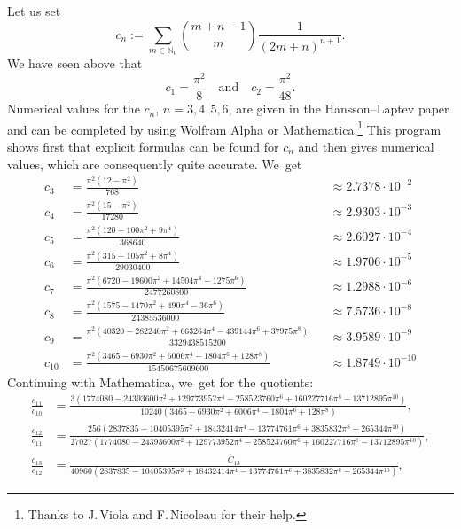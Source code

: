 \documentclass[JEP,XML,SOM,Unicode,published]{cedram}
\theoremstyle{definition}
\newcommand{\1}{\mathbbm{1}}
\newcommand{\N}{\mathbb{N}}
\begin{document}
Let us set
\begin{equation}\label{eq:defcn}
c_n := \sum_{m\in\N_0} \binom{m+n-1}{m} \frac{1}{(2m+n)^{n+1}}.
\end{equation}
We have seen above that
\[
c_1=\frac{\pi^2}8 \quad \text{and}\quad
c_2 = \frac{\pi^2}{48}.
\]
Numerical values for the $c_n$, $n=3,4,5,6$, are given in the Hansson--Laptev paper \cite{HL} and can be completed by using Wolfram Alpha or Mathematica.\footnote{Thanks to J.\,Viola and F.\,Nicoleau for their help.}
This program shows first that explicit formulas can be found for $c_n$ and then gives numerical values, which are consequently quite accurate. We~get
{\smaller\smaller
\[
\begin{aligned}
c_3 & = \frac{\pi^2(12-\pi^2)}{768} &&\approx 2.7378\cdot10^{-2}\\
c_4 & = \frac{\pi^2 (15-\pi^2)}{17280}&&\approx 2.9303 \cdot  10^{-3}\\
c_5& = \frac{\pi^2 (120-100\pi^2 + 9 \pi^4)}{368640}&&\approx 2.6027\cdot  10^{-4}\\
c_6&= \frac{\pi^2(315-105 \pi^2+ 8 \pi^4)}{29030400}&&\approx 1.9706 \cdot  10^{-5}\\
c_7&=\frac{\pi^2 (6720 - 19600 \pi^2 + 14504 \pi^4 - 1275 \pi^6)}{2477260800}&&\approx 1.2988\cdot 10^{-6}\\
c_8 &= \frac{\pi^2 (1575 - 1470 \pi^2 + 490 \pi ^4 - 36 \pi ^6)}{24385536000}&&\approx 7.5736\cdot10^{-8}\\
c_9&=\frac{\pi^2(40 320 - 282 240 \pi^2 + 663 264 \pi^4 - 439 144 \pi^6 + 37975 \pi^8)}{3329438515200}&&\approx 3.9589\cdot  10^{-9}\\
c_{10}&= \frac{\pi^2 (3465 - 6930 \pi^2 + 6006 \pi ^4 - 1804 \pi^6 + 128 \pi ^8)}{15450675609600}&&\approx1.8749\cdot10^{-10}
\end{aligned}
\]
}%
Continuing with Mathematica, we~get for the quotients:
{\smaller\smaller
\begin{align*}
\frac{c_{11}}{c_{10}} & = \frac{3 \left(1774080 - 24393600 \pi ^2 + 129773952 \pi ^4 - 258523760 \pi ^6 + 160227716 \pi ^8 - 13712895 \pi ^{10}\right)}{10240
\left(3465-6930 \pi ^2+6006 \pi ^4-1804 \pi ^6+128 \pi ^8\right)}, \\
\frac{c_{12}}{c_{11}} & = \frac{256 \left(2837835-10405395 \pi ^2 + 18432414 \pi ^4 - 13774761 \pi ^6 + 3835832 \pi ^8 - 265344 \pi ^{10}\right)}{27027
(1774080 \!-\! 24393600 \pi ^2 \!+\! 129773952 \pi ^4 \!-\! 258523760 \pi ^6 \!+\! 160227716 \pi ^8 \!-\! 13712895 \pi ^{10})},\\
\frac{c_{13}}{c_{12}} & = \frac{\hat C_{13}}{40960 \left(2837835 - 10405395 \pi ^2 + 18432414 \pi ^4 - 13774761 \pi ^6 + 3835832 \pi ^8 - 265344 \pi ^{10}\right)},
\end{align*}
}%
\end{document}

